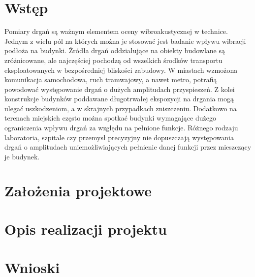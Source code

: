 \documentclass[a4paper,12pt]{mwart}
\begin{document}
\section{Wstęp}
Pomiary drgań są ważnym elementem oceny wibroakustycznej w technice. Jednym z
wielu pól na których można je stosować jest badanie wpływu wibracji podłoża na
budynki. Źródła drgań oddziałujące na obiekty budowlane są zróżnicowane, ale
najczęściej pochodzą od wszelkich środków transportu eksploatowanych w
bezpośredniej bliskości zabudowy. W miastach wzmożona komunikacja samochodowa,
ruch tramwajowy, a nawet metro, potrafią powodować występowanie drgań o dużych
amplitudach przyspieszeń. Z kolei konstrukcje budynków poddawane długotrwałej
ekspozycji na drgania mogą ulegać uszkodzeniom, a w skrajnych przypadkach
zniszczeniu. Dodatkowo na terenach miejskich często można spotkać budynki
wymagające dużego ograniczenia wpływu drgań za względu na pełnione funkcje.
Różnego rodzaju laboratoria, szpitale czy przemysł precyzyjny nie dopuszczają
występowania drgań o amplitudach uniemożliwiających pełnienie danej funkcji
przez mieszczący je budynek.

\section{Założenia projektowe}

\section{Opis realizacji projektu}

\section{Wnioski}
\end{document}
